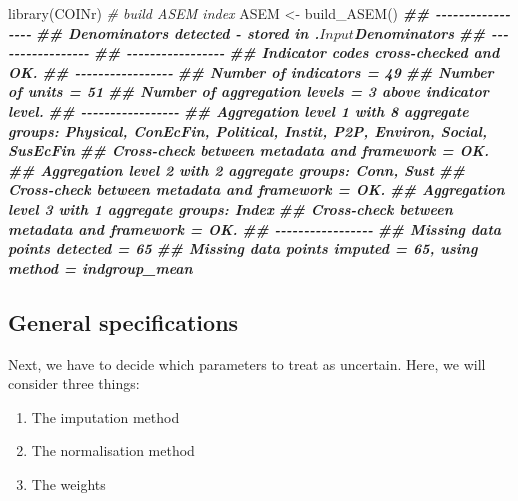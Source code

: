 \documentclass[
]{book}
\newenvironment{Shaded}{\begin{snugshade}}{\end{snugshade}}
\newcommand{\CommentTok}[1]{\textcolor[rgb]{0.56,0.35,0.01}{\textit{#1}}}
\newcommand{\DocumentationTok}[1]{\textcolor[rgb]{0.56,0.35,0.01}{\textbf{\textit{#1}}}}
\newcommand{\FunctionTok}[1]{\textcolor[rgb]{0.00,0.00,0.00}{#1}}
\newcommand{\NormalTok}[1]{#1}
\newcommand{\OtherTok}[1]{\textcolor[rgb]{0.56,0.35,0.01}{#1}}
\providecommand{\tightlist}{%
  \setlength{\itemsep}{0pt}\setlength{\parskip}{0pt}}
\begin{document}
\begin{Shaded}
\begin{Highlighting}[]
\FunctionTok{library}\NormalTok{(COINr)}
\CommentTok{\# build ASEM index}
\NormalTok{ASEM }\OtherTok{\textless{}{-}} \FunctionTok{build\_ASEM}\NormalTok{()}
\DocumentationTok{\#\# {-}{-}{-}{-}{-}{-}{-}{-}{-}{-}{-}{-}{-}{-}{-}{-}{-}}
\DocumentationTok{\#\# Denominators detected {-} stored in .$Input$Denominators}
\DocumentationTok{\#\# {-}{-}{-}{-}{-}{-}{-}{-}{-}{-}{-}{-}{-}{-}{-}{-}{-}}
\DocumentationTok{\#\# {-}{-}{-}{-}{-}{-}{-}{-}{-}{-}{-}{-}{-}{-}{-}{-}{-}}
\DocumentationTok{\#\# Indicator codes cross{-}checked and OK.}
\DocumentationTok{\#\# {-}{-}{-}{-}{-}{-}{-}{-}{-}{-}{-}{-}{-}{-}{-}{-}{-}}
\DocumentationTok{\#\# Number of indicators = 49}
\DocumentationTok{\#\# Number of units = 51}
\DocumentationTok{\#\# Number of aggregation levels = 3 above indicator level.}
\DocumentationTok{\#\# {-}{-}{-}{-}{-}{-}{-}{-}{-}{-}{-}{-}{-}{-}{-}{-}{-}}
\DocumentationTok{\#\# Aggregation level 1 with 8 aggregate groups: Physical, ConEcFin, Political, Instit, P2P, Environ, Social, SusEcFin}
\DocumentationTok{\#\# Cross{-}check between metadata and framework = OK.}
\DocumentationTok{\#\# Aggregation level 2 with 2 aggregate groups: Conn, Sust}
\DocumentationTok{\#\# Cross{-}check between metadata and framework = OK.}
\DocumentationTok{\#\# Aggregation level 3 with 1 aggregate groups: Index}
\DocumentationTok{\#\# Cross{-}check between metadata and framework = OK.}
\DocumentationTok{\#\# {-}{-}{-}{-}{-}{-}{-}{-}{-}{-}{-}{-}{-}{-}{-}{-}{-}}
\DocumentationTok{\#\# Missing data points detected = 65}
\DocumentationTok{\#\# Missing data points imputed = 65, using method = indgroup\_mean}
\end{Highlighting}
\end{Shaded}

\hypertarget{general-specifications}{%
\subsection{General specifications}\label{general-specifications}}

Next, we have to decide which parameters to treat as uncertain. Here, we will consider three things:

\begin{enumerate}
\def\labelenumi{\arabic{enumi}.}
\tightlist
\item
  The imputation method
\item
  The normalisation method
\item
  The weights
\end{enumerate}
\end{document}
